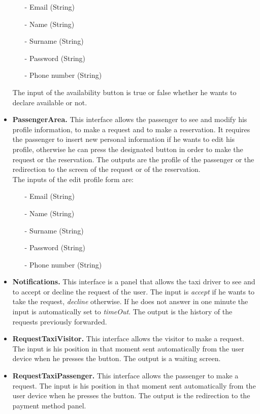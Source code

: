 \begin{itemize}
		\begin{itemize} 
			\item[-] Email (String)
			\item[-] Name (String)
			\item[-] Surname (String)
			\item[-] Password (String)
			\item[-] Phone number (String)
		\end{itemize}
		The input of the availability button is true or false whether he wants to declare available or not.
		\item \textbf{PassengerArea.}
		This interface allows the passenger to see and modify his profile information, to make a request and to make a reservation. It requires the passenger to insert new personal information if he wants to edit his profile, otherwise he can press the designated button in order to make the request or the reservation. The outputs are the profile of the passenger or the redirection to the screen of the request or of the reservation.\\ The inputs of the edit profile form are:
		\begin{itemize} 
			\item[-] Email (String)
			\item[-] Name (String)
			\item[-] Surname (String)
			\item[-] Password (String)
			\item[-] Phone number (String)
		\end{itemize}
		\item \textbf{Notifications.}
		This interface is a panel that allows the taxi driver to see and to accept or decline the request of the user. The input is \textit{accept} if he wants to take the request, \textit{decline} otherwise. If he does not answer in one minute the input is automatically set to \textit{timeOut}. The output is the history of the requests previously forwarded.
		\item \textbf{RequestTaxiVisitor.}
		This interface allows the visitor to make a request. The input is his position in that moment sent automatically from the user device when he presses the button. The output is a waiting screen.
		\item \textbf{RequestTaxiPassenger.}
		This interface allows the passenger to make a request. The input is his position in that moment sent automatically from the user device when he presses the button. The output is the redirection to the payment method panel. 

\end{itemize}
